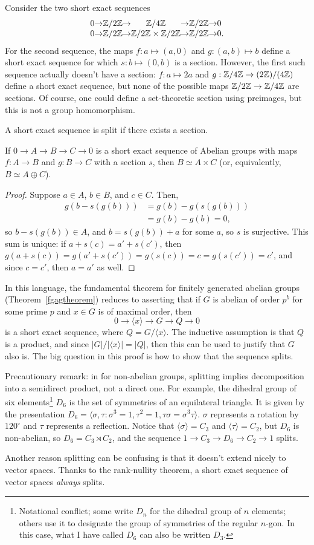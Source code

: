Consider the two short exact sequences
\[
\begin{tabular}{c @{$\to$} c @{$\to$} c @{$\to$} c @{$\to$} l}
$0$ & $\Z/2\Z$ & $\Z/4\Z$ & $\Z/2\Z$ & $0$\\
$0$ & $\Z/2\Z$ & $\Z/2\Z\times \Z/2\Z$ & $\Z/2\Z$ & $0$.
\end{tabular}
\]
For the second sequence, the maps $f:a\mapsto (a,0)$ and $g:(a,b)\mapsto b$ define a short exact sequence for which $s: b\mapsto(0,b)$ is a section. However, the first such sequence actually doesn't have a section: $f: a\mapsto 2a$ and $g:\mathbb{Z}/4\mathbb{Z} \to (2\mathbb{Z})/(4\mathbb{Z})$ define a short exact sequence, but none of the possible maps $\mathbb{Z}/2\mathbb{Z} \to \mathbb{Z}/4\mathbb{Z}$ are sections. Of course, one could define a set-theoretic section using preimages, but this is not a group homomorphism.
\begin{defn}
A short exact sequence is split if there exists a section.
\end{defn}
\begin{thm}
\label{splitting}
If $0\to A\to B\to C\to 0$ is a short exact sequence of Abelian groups with maps $f:A\to B$ and $g:B\to C$ with a section $s$, then $B \simeq A\times C$ (or, equivalently, $B\simeq A\oplus C$).
\end{thm}
\begin{proof}
Suppose $a\in A$, $b\in B$, and $c\in C$. Then,
\begin{align*}
g(b-s(g(b))) & = g(b) - g(s(g(b)))\\
&= g(b) - g(b) = 0,
\end{align*}
so $b-s(g(b))\in A$, and $b = s(g(b)) + a$ for some $a$, so $s$ is surjective. This sum is unique: if $a+s(c) = a'+s(c')$, then $g(a+s(c)) = g(a'+s(c')) = g(s(c)) = c = g(s(c')) = c'$, and since $c = c'$, then $a = a'$ as well.
\end{proof}
In this language, the fundamental theorem for finitely generated abelian groups (Theorem~\ref{fgagtheorem}) reduces to asserting that if $G$ is abelian of order $p^b$ for some prime $p$ and $x\in G$ is of maximal order, then
\[0\to\langle x\rangle \to G\to Q\to 0\]
is a short exact sequence, where $Q = G/\langle x\rangle$. The inductive assumption is that $Q$ is a product, and since $|G|/|\langle x \rangle| = |Q|$, then this can be used to justify that $G$ also is. The big question in this proof is how to show that the sequence splits.

Precautionary remark: in for non-abelian groups, splitting implies decomposition into a semidirect product, not a direct one. For example, the dihedral group of six elements\footnote{Notational conflict; some write $D_n$ for the dihedral group of $n$ elements; others use it to designate the group of symmetries of the regular $n$-gon. In this case, what I have called $D_6$ can also be written $D_3$.} $D_6$ is the set of symmetries of an equilateral triangle. It is given by the presentation $D_6 = \langle \sigma,\tau:\sigma^3 = 1,\tau^2 = 1,\tau\sigma = \sigma^3\tau\rangle$. $\sigma$ represents a rotation by $120^\circ$ and $\tau$ represents a reflection. Notice that $\langle\sigma\rangle = C_3$ and $\langle\tau\rangle = C_2$, but $D_6$ is non-abelian, so $D_6 = C_3 \rtimes C_2$, and the sequence $1\to C_3\to D_6\to C_2\to 1$ splits.

Another reason splitting can be confusing is that it doesn't extend nicely to vector spaces. Thanks to the rank-nullity theorem, a short exact sequence of vector spaces \emph{always} splits.
